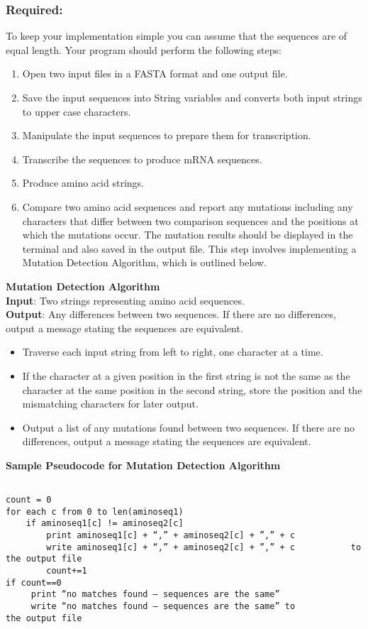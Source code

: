 \subsubsection*{Required:}
To keep your implementation simple you can assume that the sequences are of equal length. Your program should perform the following steps:
\begin{enumerate}
	\item Open two input files in a FASTA format and one output file.
	\item Save the input sequences into String variables and converts both input strings to upper case characters.
	\item Manipulate the input sequences to prepare them for transcription.
	\item Transcribe the sequences to produce mRNA sequences.
	\item Produce amino acid strings.
	\item Compare two amino acid sequences and report any mutations including any characters that differ between two comparison sequences and the positions at which the mutations occur. The mutation results should be displayed in the terminal and also saved in the output file. This step involves implementing a Mutation Detection Algorithm, which is outlined below.
\end{enumerate}
	
\noindent \textbf{Mutation Detection Algorithm} \\

\noindent \textbf{Input}: Two strings representing amino acid sequences. \\
\textbf{Output}: Any differences between two sequences. If there are no differences, output a message stating the sequences are equivalent.  \\
\begin{itemize}
	\item  Traverse each input string from left to right, one character at a time.
	\item If the character at a given position in the first string is not the same as the character at the same position in the second string, store the position and the mismatching characters for later output.
	\item Output a list of any mutations found between two sequences. If there are no differences, output a message stating the sequences are equivalent.  
\end{itemize}

\noindent \textbf{Sample Pseudocode for Mutation Detection Algorithm} \\
\begin{verbatim}

count = 0
for each c from 0 to len(aminoseq1)
	if aminoseq1[c] != aminoseq2[c]
		print aminoseq1[c] + “,” + aminoseq2[c] + ”,” + c
		write aminoseq1[c] + “,” + aminoseq2[c] + ”,” + c 			to the output file
     	count+=1
if count==0
     print “no matches found – sequences are the same”
     write “no matches found – sequences are the same” to     		the output file

\end{verbatim}

